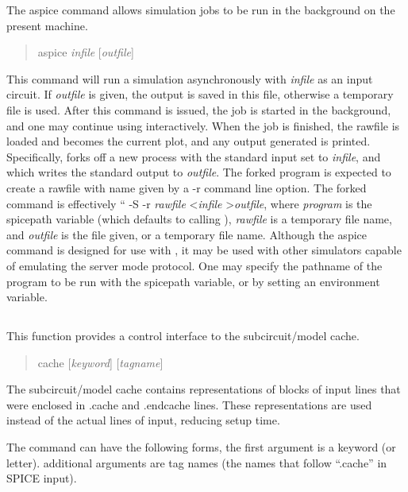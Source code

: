 The {\cb aspice} command allows simulation jobs to be run in the
background on the present machine.
\begin{quote}\vt
aspice {\it infile} [{\it outfile\/}]
\end{quote}
This command will run a simulation asynchronously with
{\it infile} as an input circuit.  If {\it outfile} is given, the
output is saved in this file, otherwise a temporary file is used. 
After this command is issued, the job is started in the background,
and one may continue using {\WRspice} interactively.  When the job is
finished, the rawfile is loaded and becomes the current plot, and any
output generated is printed.  Specifically, {\WRspice} forks off a new
process with the standard input set to {\it infile}, and which writes
the standard output to {\it outfile}.  The forked program is expected
to create a rawfile with name given by a {\vt -r} command line option. 
The forked command is effectively ``{ -S -r {\it
rawfile} <{\it infile} >{\it outfile}}, where {\it program} is the
{\et spicepath} variable (which defaults to calling {\WRspice}), {\it
rawfile} is a temporary file name, and {\it outfile} is the file
given, or a temporary file name.  Although the {\cb aspice} command is
designed for use with {\WRspice}, it may be used with other simulators
capable of emulating the {\WRspice} server mode protocol.  One may
specify the pathname of the program to be run with the {\et spicepath}
variable, or by setting an environment variable.

\subsection{}


This function provides a control interface to the subcircuit/model cache.
\begin{quote}\vt
cache [{\it keyword\/}] [{\it tagname\/}]
\end{quote}

The subcircuit/model cache contains representations of blocks of input
lines that were enclosed in {\vt .cache} and {\vt .endcache} lines. 
These representations are used instead of the actual lines of input,
reducing setup time.

The command can have the following forms, the first argument is a
keyword (or letter).  additional arguments are tag names (the names
that follow ``{\vt .cache}'' in SPICE input).

